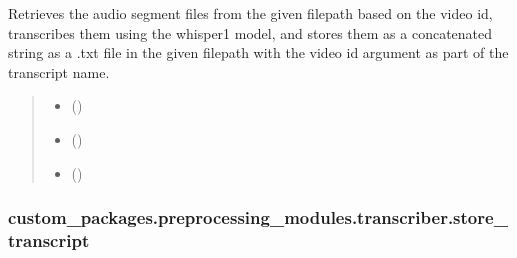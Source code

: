 \documentclass[letterpaper,10pt,english]{sphinxhowto}
\begin{document}
\begin{fulllineitems}
\label{\detokenize{_autosummary/custom_packages.preprocessing_modules.transcriber.transcribe_segmented_audio:custom_packages.preprocessing_modules.transcriber.transcribe_segmented_audio}}
\pysigstartsignatures
\pysiglinewithargsret
{}
{\sphinxparamcomma {}\sphinxparamcomma {}}
{}
\pysigstopsignatures
\sphinxAtStartPar
Retrieves the audio segment files from the given filepath based on the video id, transcribes them using
the whisper\sphinxhyphen{}1 model, and stores them as a concatenated string as a .txt file in the given filepath with
the video id argument as part of the transcript name.
\begin{quote}\begin{description}
\begin{itemize}
\item {} 
\sphinxAtStartPar
{} ()

\item {} 
\sphinxAtStartPar
{} ()

\item {} 
\sphinxAtStartPar
{} ()

\end{itemize}

\sphinxAtStartPar
{}

\end{description}\end{quote}

\end{fulllineitems}


\sphinxstepscope


\subsubsection{custom\_packages.preprocessing\_modules.transcriber.store\_transcript}
\label{\detokenize{_autosummary/custom_packages.preprocessing_modules.transcriber.store_transcript:custom-packages-preprocessing-modules-transcriber-store-transcript}}\label{\detokenize{_autosummary/custom_packages.preprocessing_modules.transcriber.store_transcript::doc}}
\end{document}
